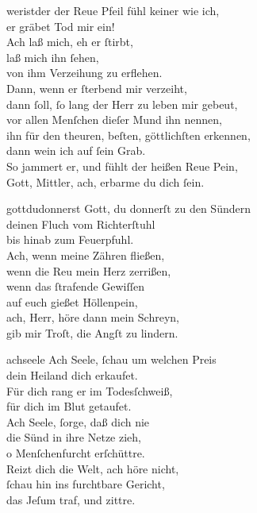 \documentclass[shorttitlesize=55,tocstyle=ref-genre]{ees}
\begin{document}
{\begin{movement}{weristder}
  der Reue Pfeil fühl keiner wie ich,\\
  er gräbet Tod mir ein!\\
  Ach laß mich, eh er ſtirbt,\\
  laß mich ihn ſehen,\\
  von ihm Verzeihung zu erflehen.\\
  Dann, wenn er ſterbend mir verzeiht,\\
  dann ſoll, ſo lang der Herr zu leben mir gebeut,\\
  vor allen Menſchen dieſer Mund ihn nennen,\\
  ihn für den theuren, beſten, göttlichſten erkennen,\\
  dann wein ich auf ſein Grab.\\
  So jammert er, und fühlt der heißen Reue Pein,\\
  Gott, Mittler, ach, erbarme du dich ſein.
\end{movement}

\begin{movement}{gottdudonnerst}
  \voice[Basso]
  Gott, du donnerſt zu den Sündern\\
  deinen Fluch vom Richterſtuhl\\
  bis hinab zum Feuerpfuhl.\\
  Ach, wenn meine Zähren fließen,\\
  wenn die Reu mein Herz zerrißen,\\
  wenn das ſtrafende Gewiſſen\\
  auf euch gießet Höllenpein,\\
  ach, Herr, höre dann mein Schreyn,\\
  gib mir Troſt, die Angſt zu lindern.
\end{movement}

\begin{movement}{achseele}
  \voice[Coro]
  Ach Seele, ſchau um welchen Preis\\
  dein Heiland dich erkaufet.\\
  Für dich rang er im Todesſchweiß,\\
  für dich im Blut getaufet.\\
  Ach Seele, ſorge, daß dich nie\\
  die Sünd in ihre Netze zieh,\\
  o Menſchenfurcht erſchüttre.\\
  Reizt dich die Welt, ach höre nicht,\\
  ſchau hin ins furchtbare Gericht,\\
  das Jeſum traf, und zittre.
\end{movement}

}
\end{document}
